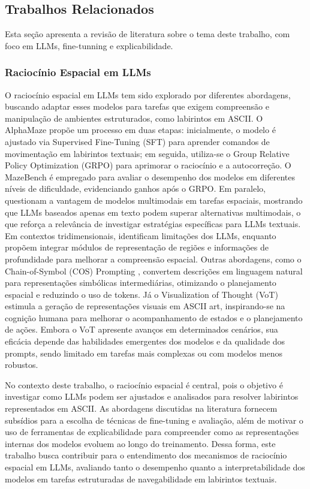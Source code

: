 \subsection{Trabalhos Relacionados}

Esta seção apresenta a revisão de literatura sobre o tema deste trabalho, com foco em LLMs, fine-tunning e explicabilidade.

\subsubsection{Raciocínio Espacial em LLMs}

O raciocínio espacial em LLMs tem sido explorado por diferentes abordagens, buscando adaptar esses modelos para tarefas que exigem compreensão e manipulação de ambientes estruturados, como labirintos em ASCII. O AlphaMaze \cite{dao2025alphamaze} propõe um processo em duas etapas: inicialmente, o modelo é ajustado via Supervised Fine-Tuning (SFT) para aprender comandos de movimentação em labirintos textuais; em seguida, utiliza-se o Group Relative Policy Optimization (GRPO) para aprimorar o raciocínio e a autocorreção. O MazeBench é empregado para avaliar o desempenho dos modelos em diferentes níveis de dificuldade, evidenciando ganhos após o GRPO. Em paralelo, \cite{jiang2024supervised} questionam a vantagem de modelos multimodais em tarefas espaciais, mostrando que LLMs baseados apenas em texto podem superar alternativas multimodais, o que reforça a relevância de investigar estratégias específicas para LLMs textuais. Em contextos tridimensionais, \cite{zhang2025point} identificam limitações dos LLMs, enquanto \cite{cheng2024spatialrgpt} propõem integrar módulos de representação de regiões e informações de profundidade para melhorar a compreensão espacial. Outras abordagens, como o Chain-of-Symbol (COS) Prompting \cite{hu2023chain}, convertem descrições em linguagem natural para representações simbólicas intermediárias, otimizando o planejamento espacial e reduzindo o uso de tokens. Já o Visualization of Thought (VoT) \cite{wu2024mind} estimula a geração de representações visuais em ASCII art, inspirando-se na cognição humana para melhorar o acompanhamento de estados e o planejamento de ações. Embora o VoT apresente avanços em determinados cenários, sua eficácia depende das habilidades emergentes dos modelos e da qualidade dos prompts, sendo limitado em tarefas mais complexas ou com modelos menos robustos.

No contexto deste trabalho, o raciocínio espacial é central, pois o objetivo é investigar como LLMs podem ser ajustados e analisados para resolver labirintos representados em ASCII. As abordagens discutidas na literatura fornecem subsídios para a escolha de técnicas de fine-tuning e avaliação, além de motivar o uso de ferramentas de explicabilidade para compreender como as representações internas dos modelos evoluem ao longo do treinamento. Dessa forma, este trabalho busca contribuir para o entendimento dos mecanismos de raciocínio espacial em LLMs, avaliando tanto o desempenho quanto a interpretabilidade dos modelos em tarefas estruturadas de navegabilidade em labirintos textuais.

